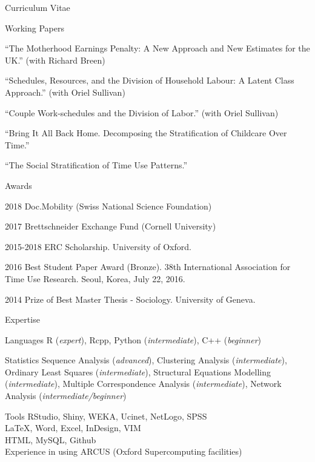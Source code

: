 \documentclass[12pt,a4paper]{article}
\newcommand*{\ac}[1]{\mbox{#1}}
\begin{document}
\begin{cv}{Curriculum Vitae}
 \begin{cvlist}{Working Papers}

  	\item ``The Motherhood Earnings Penalty: A New Approach and New
  	Estimates for the UK.'' (with Richard Breen)
  	\item ``Schedules, Resources, and the Division of Household Labour: A Latent Class Approach.'' (with Oriel Sullivan)
  	\item ``Couple Work-schedules and the Division of Labor.'' (with Oriel Sullivan)
  	\item ``Bring It All Back Home. Decomposing the Stratification of Childcare Over Time.''
  	\item ``The Social Stratification of Time Use Patterns.''

 \end{cvlist}
 
  
  \begin{cvlist}{Awards}
  	\item[2018]  Doc.Mobility (Swiss National Science Foundation)
  	\item[2017]  Brettschneider Exchange Fund (Cornell University)
  	\item [2015-2018] ERC Scholarship. University of Oxford. 
  	\item [2016]  Best Student Paper Award (Bronze). 38th International Association for Time Use Research. Seoul, Korea, July 22, 2016. 
  	\item [2014] Prize of Best Master Thesis - Sociology.  University of Geneva. 
  \end{cvlist}
  
  \begin{cvlist}{\ac{Expertise}}
  	\item[Languages] R (\emph{expert}), Rcpp, Python (\emph{intermediate}),  C++ (\emph{beginner}) 
  	
  	\item[Statistics] Sequence Analysis (\emph{advanced}), 
  	Clustering Analysis (\emph{intermediate}), 
  	Ordinary Least Squares (\emph{intermediate}), Structural Equations Modelling (\emph{intermediate}), Multiple Correspondence Analysis (\emph{intermediate}), 
  	Network Analysis (\emph{intermediate/beginner})
  	
  	\item[Tools] RStudio, Shiny, \ac{WEKA}, Ucinet, NetLogo, \ac{SPSS} \\ \LaTeX, Word, Excel, InDesign, \ac{VIM} \\ 
  	\ac{HTML},  MySQL,  Github \\ 
  	Experience in using ARCUS (Oxford Supercomputing facilities)
  \end{cvlist}



\end{cv}
\end{document}
